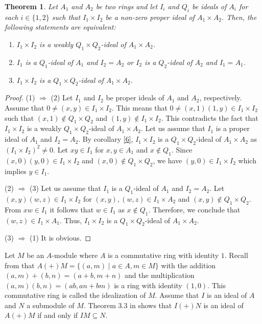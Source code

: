 \documentclass[preprint,review,10pt]{amsart}
\newtheorem{theorem}{Theorem}[section]
\theoremstyle{definition}
\theoremstyle{remark}
\numberwithin{equation}{section}
\begin{document}
\begin{theorem} \label{8}
Let $A_1$ and $A_2$ be two rings and let $I_i$ and $Q_i$ be ideals of $A_i$ for each $i \in \{1,2\}$ such that $I_1 \times I_2$ be a non-zero proper ideal of $A_1 \times A_2$. Then, the following statements are equivalent:
\begin{enumerate}
\item $I_1 \times I_2$ is a weakly $Q_1 \times Q_2$-ideal of $A_1 \times A_2$.
\item $I_1$ is a   $Q_1$-ideal of $A_1$ and $I_2=A_2$ or  $I_2$ is a   $Q_2$-ideal of $A_2$ and $I_1=A_1$.
\item $I_1 \times I_2$ is a   $Q_1 \times Q_2$-ideal of $A_1 \times A_2$.
\end{enumerate}
\end{theorem}
\begin{proof}
(1) $\Longrightarrow$ (2)  Let $I_1$ and $I_2$ be proper ideals of $A_1$ and $A_2$, respectively. Assume that $0 \neq (x,y) \in I_1 \times I_2$. This means that $0 \neq (x,1)(1,y) \in I_1 \times I_2$ such that $(x,1) \notin Q_1 \times Q_2$ and $(1,y) \notin I_1 \times I_2$. This contradicts the fact that $I_1 \times I_2$ is a   weakly $Q_1 \times Q_2$-ideal of $A_1 \times A_2$. Let us assume that $I_1$ is a proper ideal of $A_1$ and $I_2=A_2$. By corollary  \ref{6}, $I_1 \times I_2$ is a $Q_1\times Q_2$-ideal of $A_1 \times A_2$ as $(I_1 \times I_2)^2 \neq 0$. Let $xy \in I_1$ for $x,y \in A_1$ and $x \notin Q_1$. Since $(x,0)(y,0) \in I_1 \times I_2$ and $(x,0) \notin Q_1 \times Q_2$, we have $(y,0) \in I_1 \times I_2$ which implies $y \in I_1$. 

(2) $\Longrightarrow$ (3) Let us assume that $I_1$ is a   $Q_1$-ideal of $A_1$ and $I_2=A_2$. Let $(x,y)(w,z) \in I_1 \times I_2$ for $(x,y),(w,z) \in I_1 \times A_2$ and $(x,y) \notin Q_1 \times Q_2$. From $xw \in I_1$ it follows that $w \in I_1$ as $x \notin Q_1$. Therefore, we conclude that $(w,z) \in   I_1 \times A_1$. Thus, $I_1 \times I_2$ is a   $Q_1 \times Q_2$-ideal of $A_1 \times A_2$.

(3) $\Longrightarrow$ (1) It is obvious.
\end{proof}
Let   $M$ be an $A$-module where $A$ is  a commutative ring with identity $1$. Recall from \cite{Anderson} that   $A(+)M=\{(a,m) \mid a \in A, m \in M\}$ with  the  addition  $ (a, m) + (b, n) = (a + b, m + n) $ and the multiplication   $(a, m)(b, n) = (ab, an + bm)$  is a  ring with identity $(1, 0)$.  This commutative ring is called the idealization of  $M$. Assume that  $I$ is an ideal of $A$ and $N$ a submodule of $M$. Theorem 3.3 in \cite{Anderson} shows that  $I(+)N$ is an ideal of $A(+)M$ if and only if $IM \subseteq N$.
\end{document}
